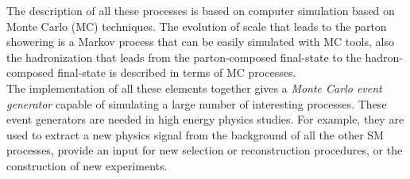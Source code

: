 \noindent The description of all these processes is based on computer simulation based on Monte Carlo (MC) techniques. The evolution of scale that leads to the parton showering is a Markov process that can be easily simulated with MC tools, also the hadronization that leads from the parton-composed final-state to the hadron-composed final-state  is described in terms of MC processes.
\\
The implementation of all these elements together gives a \textit{Monte Carlo event generator} capable of simulating a large number of interesting processes. These event generators are needed in high energy physics studies. For  example, they are used to extract a new physics signal from the background of all the other SM processes, provide an input for new selection or reconstruction procedures, or the construction of new experiments.

\medskip

